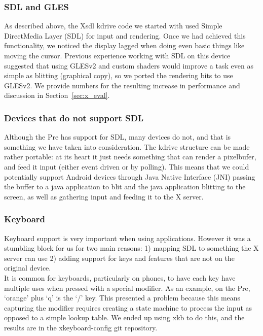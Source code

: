 \subsubsection{SDL and GLES}
As described above, the Xsdl kdrive code we started with used Simple DirectMedia Layer (SDL) \cite{sdl} for input and rendering.  Once we had achieved this functionality, we noticed the display lagged when doing even basic things like moving the cursor.  Previous experience working with SDL on this device suggested that using GLESv2 \cite{gles} and custom shaders would improve a task even as simple as blitting (graphical copy), so we ported the rendering bits to use GLESv2.  We provide numbers for the resulting increase in performance and discussion in Section~\ref{sec:x_eval}.

\subsubsection{Devices that do not support SDL}
Although the Pre has support for SDL, many devices do not, and that is something we have taken into consideration.  The kdrive structure can be made rather portable: at its heart it just needs something that can render a pixelbufer, and feed it input (either event driven or by polling).  This means that we could potentially support Android devices through Java Native Interface (JNI) \cite{jni} passing the buffer to a java application to blit and the java application blitting to the screen, as well as gathering input and feeding it to the X server. \\

\subsubsection{Keyboard}
Keyboard support is very important when using applications.  However it was a stumbling block for us for two main reasons: 1) mapping SDL to something the X server can use 2) adding support for keys and features that are not on the original device.\\

It is common for keyboards, particularly on phones, to have each key have multiple uses when pressed with a special modifier.  As an example, on the Pre, `orange' plus `q' is the `/' key.  This presented a problem because this means capturing the modifier requires creating a state machine to process the input as opposed to a simple lookup table.  We ended up using xkb to do this, and the results are in the xkeyboard-config git repository. \\

